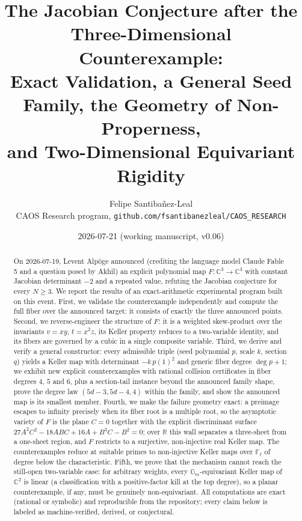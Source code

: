 \documentclass[11pt]{article}
\title{The Jacobian Conjecture after the Three-Dimensional Counterexample:\\
Exact Validation, a General Seed Family, the Geometry of Non-Properness,\\
and Two-Dimensional Equivariant Rigidity}
\author{Felipe Santiba\~nez-Leal\\
\small CAOS Research program, \texttt{github.com/fsantibanezleal/CAOS\_RESEARCH}}
\date{2026-07-21 (working manuscript, v0.06)}
\theoremstyle{definition}
\theoremstyle{remark}
\newcommand{\C}{\mathbb{C}}
\newcommand{\Gm}{\mathbb{G}_m}
\begin{document}
\maketitle

\begin{abstract}
On 2026-07-19, Levent Alp\"oge announced (crediting the language model Claude Fable 5 and a
question posed by Akhil) an explicit polynomial map $F : \C^3 \to \C^3$ with constant Jacobian
determinant $-2$ and a repeated value, refuting the Jacobian conjecture for every $N \ge 3$. We
report the results of an exact-arithmetic experimental program built on this event. First, we
validate the counterexample independently and compute the full fiber over the announced target:
it consists of exactly the three announced points. Second, we reverse-engineer the structure of
$F$: it is a weighted skew-product over the invariants $v = xy$, $t = x^2 z$, its Keller
property reduces to a two-variable identity, and its fibers are governed by a cubic in a single
composite variable. Third, we derive and verify a general constructor: every admissible triple
(seed polynomial $p$, scale $k$, section $q$) yields a Keller map with determinant $-k\,p(1)^2$
and generic fiber degree $\deg p + 1$; we exhibit new explicit counterexamples with rational
collision certificates in fiber degrees $4$, $5$ and $6$, plus a section-tail instance beyond
the announced family shape, prove the degree law $(5d - 3, 5d - 4, 4)$ within the family, and
show the announced map is its smallest member. Fourth, we make the failure geometry exact: a
preimage escapes to infinity precisely when its fiber root is a multiple root, so the
asymptotic variety of $F$ is the plane $C = 0$ together with the explicit discriminant surface
$27A^2C^2 - 18ABC + 16A + B^3C - B^2 = 0$; over $\mathbb{R}$ this wall separates a three-sheet
from a one-sheet region, and $F$ restricts to a surjective, non-injective real Keller map. The
counterexamples reduce at suitable primes to non-injective Keller maps over $\mathbb{F}_\ell$
of degree below the characteristic. Fifth, we prove that the mechanism cannot reach the
still-open two-variable case: for arbitrary weights, every $\Gm$-equivariant Keller map of
$\C^2$ is linear (a classification with a positive-factor kill at the top degree), so a planar
counterexample, if any, must be genuinely non-equivariant. All computations are exact (rational
or symbolic) and reproducible from the repository; every claim below is labeled as
machine-verified, derived, or conjectural.
\end{abstract}
\end{document}
